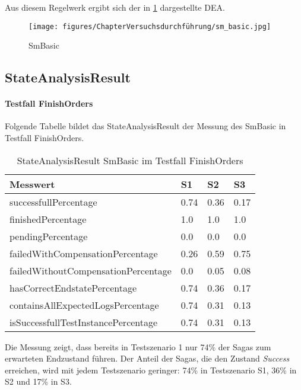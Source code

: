 Aus diesem Regelwerk ergibt sich der in \cref{fig:fig_sm_basic} dargestellte DEA. 

\begin{figure}[H]
	\centering
	\texttt{[image: figures/ChapterVersuchsdurchführung/sm\_basic.jpg]}
	\caption{SmBasic}
	\label{fig:fig_sm_basic}
\end{figure}
\FloatBarrier

\subsection{StateAnalysisResult}

\paragraph*{Testfall FinishOrders}
Folgende Tabelle bildet das StateAnalysisResult der Messung des SmBasic in Testfall FinishOrders.

\begin{center}
	\fontsize{9}{12}\selectfont
	\begin{longtable}[h]{|p{5cm}|p{1cm}|p{1cm}|p{1cm}|}
		\hline
		Messwert & S1 & S2 & S3 \\ \hline
		\endhead
		\caption{StateAnalysisResult SmBasic im Testfall FinishOrders}
		\label{tab:smbasic_stateanalysisresult_finishorders}
		\endfoot
		successfull\-Percentage & 0.74 & 0.36 & 0.17 \\ \hline
		finished\-Percentage & 1.0 & 1.0 & 1.0 \\ \hline
		pending\-Percentage & 0.0 & 0.0 & 0.0 \\ \hline
		failedWithCompensation\-Percentage & 0.26 & 0.59 & 0.75 \\ \hline
		failedWithoutCompensation\-Percentage & 0.0 & 0.05 & 0.08 \\ \hline
		hasCorrectEndstate\-Percentage & 0.74 & 0.36 & 0.17 \\ \hline
		containsAllExpectedLogs\-Percentage & 0.74 & 0.31 & 0.13 \\ \hline
		isSuccessfullTestInstance\-Percentage & 0.74 & 0.31 & 0.13 \\ \hline
	\end{longtable}
\end{center}
\FloatBarrier

Die Messung zeigt, dass bereits in Testszenario 1 nur 74\% der Sagas zum erwarteten Endzustand führen. Der Anteil der Sagas, die den Zustand \textit{Success} erreichen, wird mit jedem Testszenario geringer: 74\% in Testszenario S1, 36\% in S2 und 17\% in S3.

